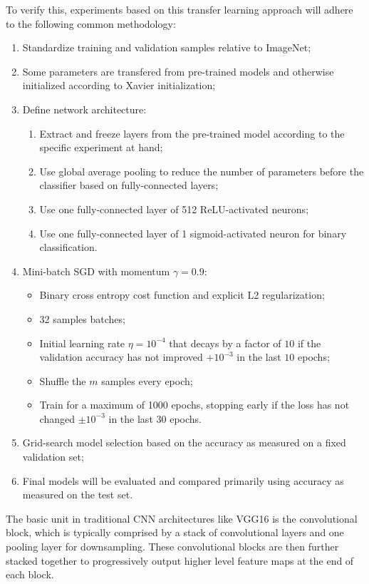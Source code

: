 To verify this, experiments based on this transfer learning approach will adhere to the following common methodology:

\begin{enumerate}
    \item Standardize training and validation samples relative to ImageNet;
    \item Some parameters are transfered from pre-trained models and otherwise initialized according to Xavier initialization;
    \item Define network architecture:
        \begin{enumerate}
            \item Extract and freeze layers from the pre-trained model according to the specific experiment at hand;
            \item Use global average pooling to reduce the number of parameters before the classifier based on fully-connected layers;
            \item Use one fully-connected layer of 512 ReLU-activated neurons;
            \item Use one fully-connected layer of 1 sigmoid-activated neuron for binary classification.
        \end{enumerate}
    \item Mini-batch \ac{SGD} with momentum $\gamma = 0.9$:
        \begin{itemize}
            \item Binary cross entropy cost function and explicit L2 regularization;
            \item 32 samples batches;
            \item Initial learning rate $\eta = 10^{-4}$ that decays by a factor of $10$ if the validation accuracy has not improved $+10^{-3}$ in the last $10$ epochs;
            \item Shuffle the $m$ samples every epoch;
            \item Train for a maximum of 1000 epochs, stopping early if the loss has not changed $\pm 10^{-3}$ in the last $30$ epochs.
        \end{itemize}
    \item Grid-search model selection based on the accuracy as measured on a fixed validation set;
    \item Final models will be evaluated and compared primarily using accuracy as measured on the test set.
\end{enumerate}

The basic unit in traditional \ac{CNN} architectures like VGG16 is the convolutional block, which is typically comprised by a stack of convolutional layers and one pooling layer for downsampling. These convolutional blocks are then further stacked together to progressively output higher level feature maps at the end of each block.

